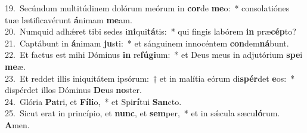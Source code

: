 {19.~}Secúndum multitúdinem dolórum meórum in \textbf{cor}de \textbf{me}o:~* consolatiónes tuæ lætificavérunt \textbf{á}nimam \textbf{me}am.\\
{20.~}Numquid adhǽret tibi sedes i\textbf{ni}qui\textbf{tá}tis:~* qui fingis labórem \textbf{in} præ\textbf{cép}to?\\
{21.~}Captábunt in \textbf{á}nimam \textbf{ju}sti:~* et sánguinem innocéntem \textbf{con}dem\textbf{ná}bunt.\\
{22.~}Et factus est mihi Dóminus \textbf{in} re\textbf{fú}\textbf{gi}um:~* et Deus meus in adjutórium \textbf{spe}i \textbf{me}æ.\\
{23.~}Et reddet illis iniquitátem ipsórum:~† et in malítia eórum di\textbf{spér}det \textbf{e}os:~* dispérdet illos Dóminus \textbf{De}us \textbf{no}ster.\\
{24.~}Glória \textbf{Pa}tri, et \textbf{Fí}\textbf{li}o,~* et Spi\textbf{rí}tui \textbf{San}cto.\\
{25.~}Sicut erat in princípio, et \textbf{nunc}, et \textbf{sem}per,~* et in sǽcula sæcu\textbf{ló}rum. \textbf{A}men.\\

